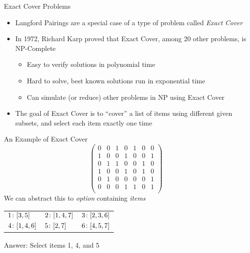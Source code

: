 \documentclass[aspectratio=169, handout]{beamer}
\begin{document}
\begin{frame}{Exact Cover Problems}
    \begin{itemize}
        \item Langford Pairings are a special case of a type of problem called \emph{Exact Cover} \pause
        \item In 1972, Richard Karp proved that Exact Cover, among 20 other problems, is \textcolor{sigma@mainblue}{NP-Complete}
        \begin{itemize}
            \item Easy to verify solutions in polynomial time
            \item Hard to solve, best known solutions run in exponential time 
            \item Can simulate (or reduce) other problems in NP using Exact Cover
        \end{itemize} \pause
        \item The goal of Exact Cover is to ``cover'' a list of items using different given subsets, and select each item exactly one time
    \end{itemize}
\end{frame}

\begin{frame}{An Example of Exact Cover}
    \[
        \begin{pmatrix}
            0 & 0 & 1 & 0 & 1 & 0 & 0 \\
            1 & 0 & 0 & 1 & 0 & 0 & 1 \\
            0 & 1 & 1 & 0 & 0 & 1 & 0 \\
            1 & 0 & 0 & 1 & 0 & 1 & 0 \\
            0 & 1 & 0 & 0 & 0 & 0 & 1 \\
            0 & 0 & 0 & 1 & 1 & 0 & 1 \\
        \end{pmatrix}
    \] \pause 
    We can abstract this to \emph{option} containing \emph{items}
    \begin{table}[]
        \begin{tabular}{ l l l }
            $1\colon \bqty{3, 5}$& $2\colon \bqty{1, 4, 7}$ & $3\colon \bqty{2, 3, 6}$ \\ 
            $4\colon \bqty{1, 4, 6}$ & $5\colon \bqty{2, 7}$ & $6\colon \bqty{4, 5, 7}$ \\ 
        \end{tabular}
    \end{table} \pause
    \textcolor{sigma@mainblue}{Answer:} Select items 1, 4, and 5
\end{frame}
\end{document}
